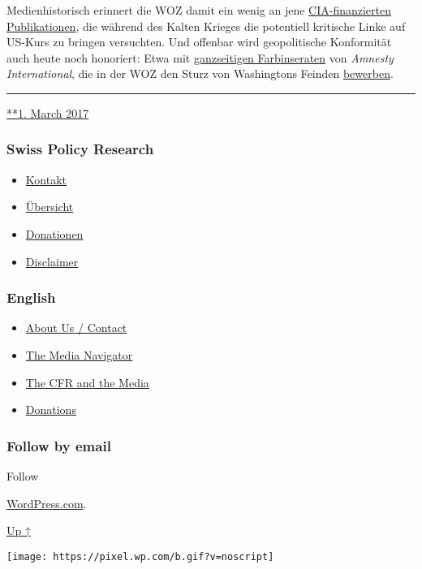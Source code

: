 Medien­historisch erinnert die WOZ damit ein wenig an jene
\href{https://www.youtube.com/watch?v=3QAgCFjNXJE}{CIA-finanzierten
Publika­tionen}, die während des Kalten Krieges die potentiell kritische
Linke auf US-Kurs zu bringen versuchten. Und offenbar wird
geo­poli­tische Konfor­mität auch heute noch honoriert: Etwa mit
\href{https://swprs.files.wordpress.com/2017/10/amnesty-international-werbung.png}{ganz­seitigen
Farb­inseraten} von \emph{Amnesty Inter­national}, die in der WOZ den
Sturz von Washingtons Feinden
\href{https://consortiumnews.com/2012/06/18/amnestys-shilling-for-us-wars/}{bewerben}.

\begin{center}\rule{0.5\linewidth}{\linethickness}\end{center}

\href{https://swprs.org/2017/03/01/die-woz-und-die-weltpolitik/}{**1.
March 2017}

\hypertarget{swiss-policy-research}{%
\subsubsection{Swiss Policy Research}\label{swiss-policy-research}}

\begin{itemize}
\tightlist
\item
  \href{https://swprs.org/kontakt/}{Kontakt}
\item
  \href{https://swprs.org/uebersicht/}{Übersicht}
\item
  \href{https://swprs.org/donationen/}{Donationen}
\item
  \href{https://swprs.org/disclaimer/}{Disclaimer}
\end{itemize}

\hypertarget{english}{%
\subsubsection{English}\label{english}}

\begin{itemize}
\tightlist
\item
  \href{https://swprs.org/contact/}{About Us / Contact}
\item
  \href{https://swprs.org/media-navigator/}{The Media Navigator}
\item
  \href{https://swprs.org/the-american-empire-and-its-media/}{The CFR
  and the Media}
\item
  \href{https://swprs.org/donations/}{Donations}
\end{itemize}

\hypertarget{follow-by-email}{%
\subsubsection{Follow by email}\label{follow-by-email}}

Follow

\href{https://wordpress.com/?ref=footer_custom_com}{WordPress.com}.

\protect\hyperlink{}{Up ↑}

\texttt{[image: https://pixel.wp.com/b.gif?v=noscript]}
